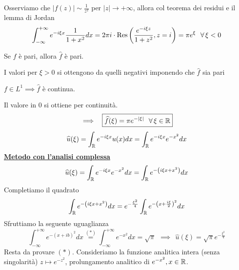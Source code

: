 \begin{figure}[htpb]
\end{figure}
\FloatBarrier

Osserviamo che $| f(z)| \sim \frac{1}{z^{2}}$ per $| z| \rightarrow + \infty $, allora col teorema dei residui e il lemma di Jordan
\begin{equation*}
\int ^{ + \infty }_{ - \infty } e^{ - i\xi x}\frac{1}{1 + x^{2}} dx = 2\pi i\cdot \Res \left(\frac{e^{ - i\xi z}}{1 + z^{2}} ,z = i\right) = \pi e^{\xi } \ \ \forall \xi < 0
\end{equation*}
\begin{rem}
Se $f$ è pari, allora $\hat{f}$ è pari.
\end{rem}
I valori per $\xi  > 0$ si ottengono da quelli negativi imponendo che $\hat{f}$ sia pari
\begin{rem}
$f\in L^{1} \implies \hat{f}$ è continua.
\end{rem}
Il valore in $0$ si ottiene per continuità.
\begin{equation*}
\implies \ \ \boxed{\hat{f}(\xi) = \pi e^{ - | \xi | } \ \ \forall \xi \in \RR }
\end{equation*}
\Soluzione
\begin{equation*}
\widehat{u}(\xi) = \int _{\mathbb{R} } e^{ - i\xi x} u(x) dx = \int _{\mathbb{R} } e^{ - i\xi x} e^{ - x^{2}} dx
\end{equation*}
\textbf{\underline{Metodo con l'analisi complessa}}
\begin{equation*}
\widehat{u}(\xi) = \int _{\mathbb{R} } e^{ - i\xi x} e^{ - x^{2}} dx = \int _{\mathbb{R} } e^{ - \left(i\xi x + x^{2}\right)} dx
\end{equation*}
Completiamo il quadrato
\begin{equation*}
\int _{\mathbb{R} } e^{ - \left(i\xi x + x^{2}\right)} dx = e^{ - \frac{\xi ^{2}}{4}}\int _{\mathbb{R} } e^{ - \left(x + \frac{i\xi }{2}\right)^{2}} dx
\end{equation*}
Sfruttiamo la seguente uguaglianza
\begin{equation*}
\int ^{ + \infty }_{ - \infty } e^{ - (x + ib)^{2}} dx\overset{(*)}{ = }\int ^{ + \infty }_{ - \infty } e^{ - x^{2}} dx = \sqrt{\pi } \ \ \implies \ \ \boxed{\hat{u}(\xi) = \sqrt{\pi } e^{ - \frac{\xi ^{2}}{4}}}
\end{equation*}
Resta da provare $(*)$. Consideriamo la funzione analitica intera (senza singolarità) $z\mapsto e^{ - z^{2}}$, prolungamento analitico di $e^{ - x^{2}} ,x\in \mathbb{R} $.


